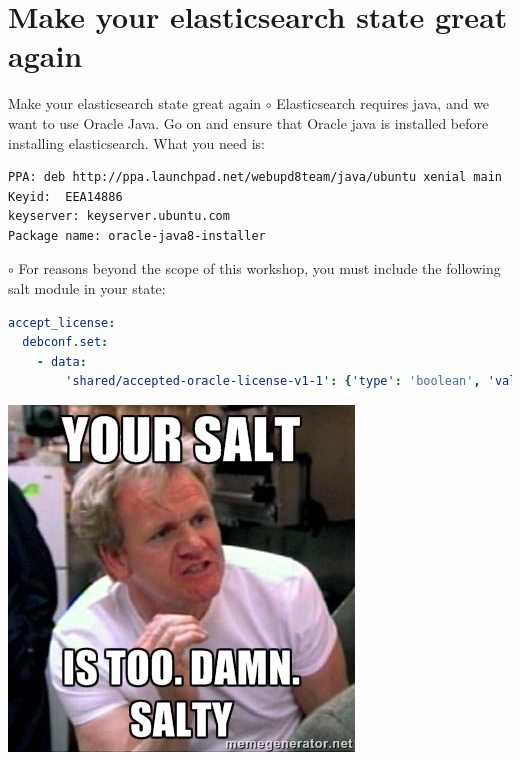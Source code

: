 \documentclass[dvipsnames]{beamer}
\begin{document}
\section{Make your elasticsearch state great again}
\begin{frame}[fragile]{Make your elasticsearch state great again}
$\circ$ Elasticsearch requires java, and we want to use Oracle Java. Go on and ensure that 
Oracle java is installed before installing elasticsearch. What you need is:
\begin{lstlisting}[language=bash,basicstyle=\footnotesize\ttfamily]
PPA: deb http://ppa.launchpad.net/webupd8team/java/ubuntu xenial main
Keyid:  EEA14886
keyserver: keyserver.ubuntu.com
Package name: oracle-java8-installer
\end{lstlisting}
\vspace{15pt}
$\circ$ For reasons beyond the scope of this workshop, you must include 
the following salt module in your state:
\begin{lstlisting}[language=yaml]
accept_license:
  debconf.set:
    - data:
        'shared/accepted-oracle-license-v1-1': {'type': 'boolean', 'value': True}
\end{lstlisting}
\end{frame}
\begin{frame}
\center
\includegraphics[scale=0.8]{36555134}
\end{frame}
\end{document}
